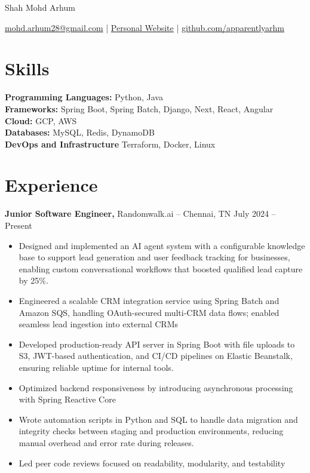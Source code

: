 \documentclass[11pt]{article}       %
\begin{document}
\centerline{\Huge Shah Mohd Arhum}

\vspace{5pt}

\centerline{\href{mailto:mohd.arhum28@gmail.com}{mohd.arhum28@gmail.com} | \href{https://apparentlyarhm.github.io/notaportfolio/}{Personal Website} | \href{https://github.com/apparentlyarhm}{github.com/apparentlyarhm}}

\vspace{-10pt}

\section*{Skills}
\textbf{Programming Languages:} Python, Java \\
\textbf{Frameworks:} Spring Boot, Spring Batch, Django, Next, React, Angular \\
\textbf{Cloud:} GCP, AWS \\
\textbf{Databases:} MySQL, Redis, DynamoDB \\
\textbf{DevOps and Infrastructure} Terraform, Docker, Linux

\vspace{-6.5pt}

\section*{Experience}
\textbf{Junior Software Engineer,} {Randomwalk.ai} -- Chennai, TN \hfill July 2024 -- Present \\
\vspace{-9pt}
\begin{itemize}
    \item Designed and implemented an AI agent system with a configurable knowledge base to support lead generation and user feedback tracking for businesses, enabling custom conversational workflows that boosted qualified lead capture by 25\%.
    \item Engineered a scalable CRM integration service using Spring Batch and Amazon SQS, handling OAuth-secured multi-CRM data flows; enabled seamless lead ingestion into external CRMs
    \item Developed production-ready API server in Spring Boot with file uploads to S3, JWT-based authentication, and CI/CD pipelines on Elastic Beanstalk, ensuring reliable uptime for internal tools.
    \item Optimized backend responsiveness by introducing asynchronous processing with Spring Reactive Core 
    \item Wrote automation scripts in Python and SQL to handle data migration and integrity checks between staging and production environments, reducing manual overhead and error rate during releases.
    \item Led peer code reviews focused on readability, modularity, and testability

\end{itemize}
\end{document}
